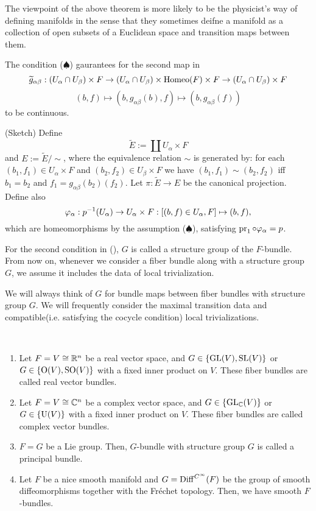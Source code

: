 \documentclass{../../small}
\begin{document}
The viewpoint of the above theorem is more likely to be the physicist's way of defining manifolds in the sense that they sometimes deifne a manifold as a collection of open subsets of a Euclidean space and transition maps between them.

The condition ($\spadesuit$) gaurantees for the second map in
\[\widetilde g_{\alpha\beta}:(U_\alpha\cap U_\beta)\times F\to(U_\alpha\cap U_\beta)\times\operatorname{Homeo}(F)\times F\to(U_\alpha\cap U_\beta)\times F\]
\[(b,f)\mapsto(b,g_{\alpha\beta}(b),f)\mapsto(b,g_{\alpha\beta}(f))\]
to be continuous.

\begin{pf}(Sketch)
Define
\[\tilde E:=\coprod U_\alpha\times F\]
and $E:=\tilde E/\sim$, where the equivalence relation $\sim$ is generated by: for each $(b_1,f_1)\in U_\alpha\times F$ and $(b_2,f_2)\in U_\beta\times F$ we have $(b_1,f_1)\sim(b_2,f_2)$ iff $b_1=b_2$ and $f_1=g_{\alpha\beta}(b_2)(f_2)$.
Let $\pi:\tilde E\to E$ be the canonical projection.
Define also
\[\varphi_\alpha:p^{-1}(U_\alpha)\to U_\alpha\times F:[(b,f)\in U_\alpha,F]\mapsto (b,f),\] which are homeomorphisms by the assumption ($\spadesuit$), satisfying $\operatorname{pr}_1\circ\varphi_\alpha=p$.
\end{pf}

For the second condition in (\spadesuit), $G$ is called a structure group of the $F$-bundle.
From now on, whenever we consider a fiber bundle along with a structure group $G$, we assume it includes the data of local trivialization.

\begin{rmk*}
We will always think of $G$ for bundle maps between fiber bundles with structure group $G$.
We will frequently consider the maximal transition data and compatible(i.e. satisfying the cocycle condition) local trivializations.
\end{rmk*}
\begin{ex*}\,
\begin{enumerate}
\item Let $F=V\cong\mathbb{R}^n$ be a real vector space, and $G\in\{\mathrm{GL}(V),\mathrm{SL}(V)\}$ or $G\in\{\mathrm{O}(V),\mathrm{SO}(V)\}$ with a fixed inner product on $V$. These fiber bundles are called real vector bundles.
\item Let $F=V\cong\mathbb{C}^n$ be a complex vector space, and $G\in\{\mathrm{GL}_{\mathbb{C}}(V)\}$ or $G\in\{\mathrm{U}(V)\}$ with a fixed inner product on $V$. These fiber bundles are called complex vector bundles.
\item $F=G$ be a Lie group. Then, $G$-bundle with structure group $G$ is called a principal bundle.
\item Let $F$ be a nice smooth manifold and $G=\operatorname{Diff}^{C^\infty}(F)$ be the group of smooth diffeomorphisms together with the Fr\'echet topology. Then, we have smooth $F$-bundles.
\end{enumerate}
\end{ex*}
\end{document}
